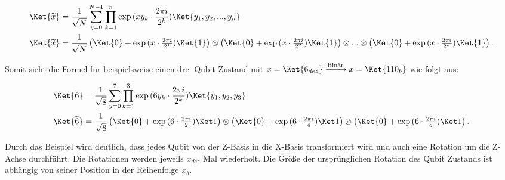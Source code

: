 \begin{align*}
    \Ket{\widetilde{x}} & = \frac{1}{\sqrt{N}} \sum_{y=0}^{N-1} \prod_{k=1}^{n} \exp{(x y_k \cdot \frac{2\pi i}{2^k})} \Ket{y_1, y_2, ..., y_n} \\
    \Ket{\widetilde{x}} & = \frac{1}{\sqrt{N}}
    \begin{pmatrix}\Ket{0} + \exp{(x\cdot\frac{2\pi i}{2^1})}\Ket{1}\end{pmatrix} \otimes \begin{pmatrix}\Ket{0} + \exp{(x\cdot\frac{2\pi i}{2^2})}\Ket{1}\end{pmatrix}
    \otimes ... \otimes \begin{pmatrix}\Ket{0} + \exp{(x\cdot\frac{2\pi i}{2^n})}\Ket{1}\end{pmatrix}.
\end{align*}

Somit sieht die Formel für beispielsweise einen drei Qubit Zustand mit
\(x=\Ket{6_{dez}} \xrightarrow{\text{Binär}} x=\Ket{110_b}\) wie folgt aus:

\begin{align*}
    \Ket{\widetilde{6}} & = \frac{1}{\sqrt{8}} \sum_{y=0}^{7} \prod_{k=1}^{3} \exp{(6 y_k \cdot \frac{2\pi i}{2^k})} \Ket{y_1, y_2, y_3} \\
    \Ket{\widetilde{6}} & = \frac{1}{\sqrt{8}}
    \begin{pmatrix}\Ket{0} + \exp{(6\cdot\frac{2\pi i}{2})} \Ket1\end{pmatrix} \otimes \begin{pmatrix}\Ket{0} + \exp{(6\cdot\frac{2\pi i}{4})} \Ket1\end{pmatrix} \otimes \begin{pmatrix}\Ket{0} + \exp{(6\cdot\frac{2\pi i}{8})} \Ket1\end{pmatrix}.
\end{align*}

Durch das Beispiel wird deutlich, dass jedes Qubit von der Z-Basis in die X-Basis transformiert wird und auch eine Rotation um die Z-Achse durchführt. Die Rotationen werden jeweils \(x_{dez}\) Mal wiederholt. Die Größe der ursprünglichen Rotation des Qubit Zustands ist abhängig von seiner Position in der Reihenfolge \(x_{b}\).

